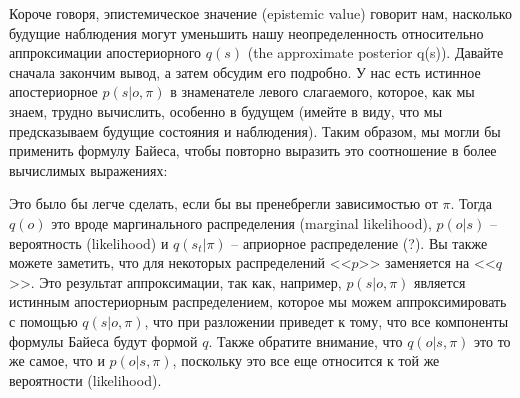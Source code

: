 \documentclass[twoside,leqno, 11pt]{article}
\begin{document}
	Короче говоря, эпистемическое значение (epistemic value) говорит нам, насколько будущие наблюдения могут уменьшить нашу неопределенность относительно аппроксимации апостериорного $q(s)$ (the approximate posterior q(s)). Давайте сначала закончим вывод, а затем обсудим его подробно. У нас есть истинное апостериорное $p(s|o,\pi)$ в знаменателе левого слагаемого, которое, как мы знаем, трудно вычислить, особенно в будущем (имейте в виду, что мы предсказываем будущие состояния и наблюдения). Таким образом, мы могли бы применить формулу Байеса, чтобы повторно выразить это соотношение в более вычислимых выражениях:
	
	
	\begin{figure}[h]
	\end{figure}
	
	Это было бы легче сделать, если бы вы пренебрегли зависимостью от $\pi$. Тогда $q(o)$ это вроде маргинального распределения (marginal likelihood), $p(o|s)$ -- вероятность (likelihood) и $q(s_t|\pi)$ -- априорное распределение (?). Вы также можете заметить, что для некоторых распределений <<$p$>> заменяется на <<$q$>>. Это результат аппроксимации, так как, например, $p(s|o,\pi)$ является истинным апостериорным распределением, которое мы можем аппроксимировать с помощью $q(s|o,\pi)$, что при разложении приведет к тому, что все компоненты формулы Байеса будут формой $q$. Также обратите внимание, что $q(o|s,\pi)$ это то же самое, что и $p(o|s,\pi)$, поскольку это все еще относится к той же вероятности (likelihood).
	
\end{document}
